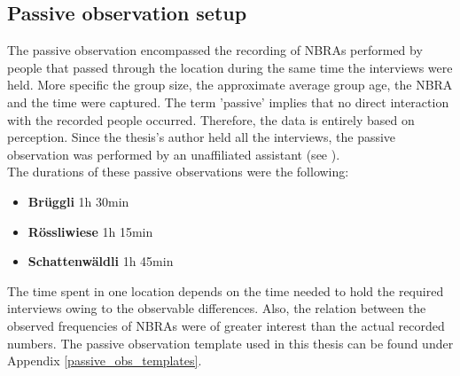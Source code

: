 \subsection{Passive observation setup} \label{passive_observation_setup}
The passive observation encompassed the recording of NBRAs performed by people that passed through the location during the same time the interviews were held. More specific the group size, the approximate average group age, the NBRA and the time were captured. The term 'passive' implies that no direct interaction with the recorded people occurred. Therefore, the data is entirely based on perception.
Since the thesis's author held all the interviews, the passive observation was performed by an unaffiliated assistant (see ).\\
The durations of these passive observations were the following:
\begin{itemize}
    \item \textbf{Br\"uggli} 1h 30min
    \item \textbf{R\"ossliwiese} 1h 15min
    \item \textbf{Schattenw\"aldli} 1h 45min
\end{itemize}
The time spent in one location depends on the time needed to hold the required interviews owing to the observable differences. Also, the relation between the observed frequencies of NBRAs were of greater interest than the actual recorded numbers.
The passive observation template used in this thesis can be found under Appendix \ref{passive_obs_templates}.

